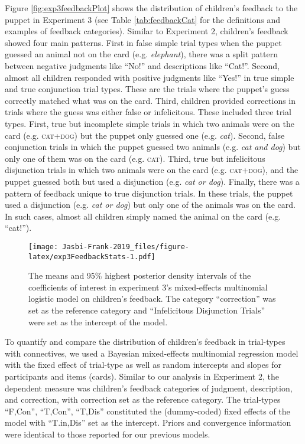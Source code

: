 \documentclass[,man,floatsintext]{apa6}
\begin{document}
Figure \ref{fig:exp3feedbackPlot} shows the distribution of children's feedback to the puppet in Experiment 3 (see Table \ref{tab:feedbackCat} for the definitions and examples of feedback categories). Similar to Experiment 2, children's feedback showed four main patterns. First in false simple trial types when the puppet guessed an animal not on the card (e.g. \emph{elephant}), there was a split pattern between negative judgments like \enquote{No!} and descriptions like \enquote{Cat!}. Second, almost all children responded with positive judgments like \enquote{Yes!} in true simple and true conjunction trial types. These are the trials where the puppet's guess correctly matched what was on the card. Third, children provided corrections in trials where the guess was either false or infelicitous. These included three trial types. First, true but incomplete simple trials in which two animals were on the card (e.g. \textsc{cat+dog}) but the puppet only guessed one (e.g. \emph{cat}). Second, false conjunction trials in which the puppet guessed two animals (e.g. \emph{cat and dog}) but only one of them was on the card (e.g. \textsc{cat}). Third, true but infelicitous disjunction trials in which two animals were on the card (e.g. \textsc{cat+dog}), and the puppet guessed both but used a disjunction (e.g. \emph{cat or dog}). Finally, there was a pattern of feedback unique to true disjunction trials. In these trials, the puppet used a disjunction (e.g. \emph{cat or dog}) but only one of the animals was on the card. In such cases, almost all children simply named the animal on the card (e.g. \enquote{cat!}).

\begin{figure}
\centering
\texttt{[image: Jasbi-Frank-2019\_files/figure-latex/exp3FeedbackStats-1.pdf]}
\caption{\label{fig:exp3FeedbackStats}The means and 95\% highest posterior density intervals of the coefficients of interest in experiment 3's mixed-effects multinomial logistic model on children's feedback. The category \enquote{correction} was set as the reference category and \enquote{Infelicitous Disjunction Trials} were set as the intercept of the model.}
\end{figure}

To quantify and compare the distribution of children's feedback in trial-types with connectives, we used a Bayesian mixed-effects multinomial regression model with the fixed effect of trial-type as well as random intercepts and slopes for participants and items (cards). Similar to our analysis in Experiment 2, the dependent measure was children's feedback categories of judgment, description, and correction, with correction set as the reference category. The trial-types \enquote{F,Con}, \enquote{T,Con}, \enquote{T,Dis} constituted the (dummy-coded) fixed effects of the model with \enquote{T.in,Dis} set as the intercept. Priors and convergence information were identical to those reported for our previous models.
\end{document}

